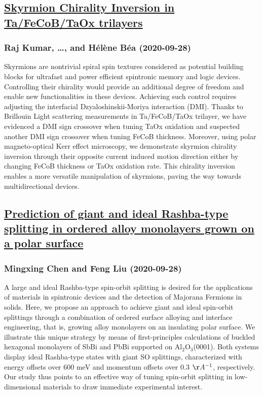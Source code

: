 \subsection*{\href{http://arxiv.org/abs/2009.13136v1}{Skyrmion Chirality Inversion in Ta/FeCoB/TaOx trilayers}}
\subsubsection*{Raj Kumar, \dots, and Hélène Béa (2020-09-28)}
Skyrmions are nontrivial spiral spin textures considered as potential
building blocks for ultrafast and power efficient spintronic memory and logic
devices. Controlling their chirality would provide an additional degree of
freedom and enable new functionalities in these devices. Achieving such control
requires adjusting the interfacial Dzyaloshinskii-Moriya interaction (DMI).
Thanks to Brillouin Light scattering measurements in Ta/FeCoB/TaOx trilayer, we
have evidenced a DMI sign crossover when tuning TaOx oxidation and suspected
another DMI sign crossover when tuning FeCoB thickness. Moreover, using polar
magneto-optical Kerr effect microscopy, we demonstrate skyrmion chirality
inversion through their opposite current induced motion direction either by
changing FeCoB thickness or TaOx oxidation rate. This chirality inversion
enables a more versatile manipulation of skyrmions, paving the way towards
multidirectional devices.

\subsection*{\href{http://arxiv.org/abs/2009.13115v1}{Prediction of giant and ideal Rashba-type splitting in ordered alloy  monolayers grown on a polar surface}}
\subsubsection*{Mingxing Chen and Feng Liu (2020-09-28)}
A large and ideal Rashba-type spin-orbit splitting is desired for the
applications of materials in spintronic devices and the detection of Majorana
Fermions in solids. Here, we propose an approach to achieve giant and ideal
spin-orbit splittings through a combination of ordered surface alloying and
interface engineering, that is, growing alloy monolayers on an insulating polar
surface. We illustrate this unique strategy by means of first-principles
calculations of buckled hexagonal monolayers of SbBi and PbBi supported on
Al$_2$O$_3$(0001). Both systems display ideal Rashba-type states with giant SO
splittings, characterized with energy offsets over 600 meV and momentum offsets
over 0.3 $\AA^{-1}$, respectively. Our study thus points to an effective way of
tuning spin-orbit splitting in low-dimensional materials to draw immediate
experimental interest.

